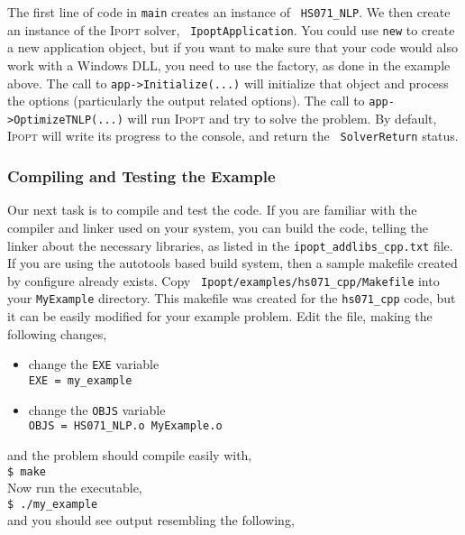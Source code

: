 \documentclass[10pt]{article}
\newcommand{\Ipopt}{\textsc{Ipopt}\xspace}
\begin{document}
The first line of code in {\tt main} creates an instance of {\tt
  HS071\_NLP}. We then create an instance of the \Ipopt solver, {\tt
  IpoptApplication}. You could use \texttt{new} to create a new
application object, but if you want to make sure that your code would
also work with a Windows DLL, you need to use the factory, as done in
the example above. The call to {\tt app->Initialize(...)} will
initialize that object and process the options (particularly the output
related options). The call to {\tt app->OptimizeTNLP(...)}  will
run \Ipopt and try to solve the problem. By default, \Ipopt will
write its progress to the console, and return the {\tt
  SolverReturn} status.

\subsubsection{Compiling and Testing the Example}
Our next task is to compile and test the code. If you are familiar
with the compiler and linker used on your system, you can build the
code, telling the linker about the 
 necessary libraries, as listed
in the {\tt ipopt\_addlibs\_cpp.txt} file.
If you are using the autotools based build system, then a sample makefile 
created by configure already exists.  Copy {\tt
  Ipopt/examples/hs071\_cpp/Makefile} into your {\tt MyExample}
directory.  This makefile was created for the {\tt hs071\_cpp} code,
but it can be easily modified for your example problem. Edit the file,
making the following changes,

\begin{itemize}
\item change the {\tt EXE} variable \\
{\tt EXE = my\_example}
\item change the {\tt OBJS} variable \\
{\tt OBJS = HS071\_NLP.o MyExample.o}
\end{itemize}
and the problem should compile easily with, \\
{\tt \$ make} \\
Now run the executable,\\ 
{\tt \$ ./my\_example} \\
and you should see output resembling the following,
\end{document}
